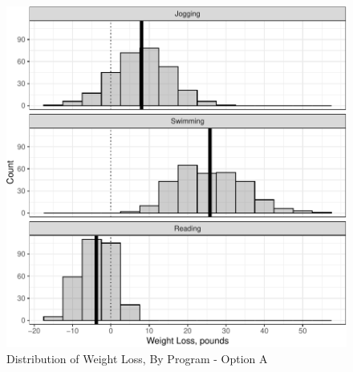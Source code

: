\documentclass[
]{article}
\begin{document}
\begin{figure}[hb]

\includegraphics{Appendix_ex_weightloss_files/figure-latex/unnamed-chunk-29-1} \hfill{}

\caption{Distribution of Weight Loss, By Program - Option A}\label{fig:unnamed-chunk-29}
\end{figure}

\clearpage
\end{document}
